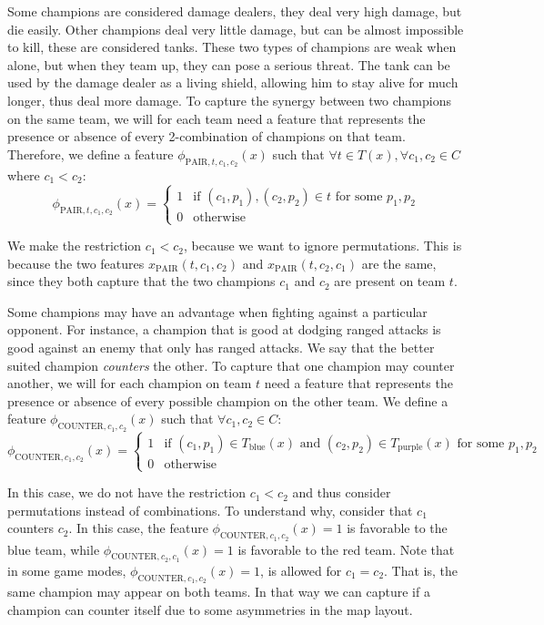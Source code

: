Some champions are considered damage dealers, they deal very high damage, but die easily. Other champions deal very little damage, but can be almost impossible to kill, these are considered tanks. These two types of champions are weak when alone, but when they team up, they can pose a serious threat. The tank can be used by the damage dealer as a living shield, allowing him to stay alive for much longer, thus deal more damage.
To capture the synergy between two champions on the same team, we will for each team need a feature that represents the presence or absence of every 2-combination of champions on that team. Therefore, we define a feature $\phi_{\text{PAIR},t, c_1, c_2}(x)$ such that $\forall t \in T(x), \forall c_1, c_2 \in C$ where $c_1 < c_2$:
\begin{equation}\label{eq:pair}
\phi_{\text{PAIR}, t, c_1, c_2}(x) =
\begin{cases}
  1 & \text{if } (c_1, p_1), (c_2, p_2) \in t \text{ for some }p_1, p_2\\
  0 & \text{otherwise}
\end{cases}
\end{equation}

We make the restriction $c_1 < c_2$, because we want to ignore permutations. This is because the two features $x_\text{PAIR}(t, c_1, c_2)$ and $x_\text{PAIR}(t, c_2, c_1)$ are the same, since they both capture that the two champions $c_1$ and $c_2$ are present on team $t$.

Some champions may have an advantage when fighting against a particular opponent.
For instance, a champion that is good at dodging ranged attacks is good against an enemy that only has ranged attacks.
We say that the better suited champion \emph{counters} the other.
To capture that one champion may counter another, we will for each champion on team $t$ need a feature that represents the presence or absence of every possible champion on the other team.
We define a feature $\phi_{\text{COUNTER},c_1,c_2}(x)$ such that $\forall c_1, c_2 \in C:$
\begin{equation}\label{eq:counter}
\phi_{\text{COUNTER},c_1,c_2}(x) = 
\begin{cases} 
1 & \text{if } (c_1, p_1) \in T_\text{blue}(x) \text{ and } (c_2, p_2) \in T_\text{purple}(x) \text{ for some } p_1, p_2 \\ 
0 & \text{otherwise} 
\end{cases}
\end{equation}

In this case, we do not have the restriction $c_1 < c_2$ and thus consider permutations instead of combinations.
To understand why, consider that $c_1$ counters $c_2$.
In this case, the feature $\phi_{\text{COUNTER},c_1,c_2}(x) = 1$ is favorable to the blue team, while $\phi_{\text{COUNTER},c_2,c_1}(x) = 1$ is favorable to the red team.
Note that in some game modes, $\phi_{\text{COUNTER},c_1,c_2}(x) = 1$, is allowed for $c_1 = c_2$. That is, the same champion may appear on both teams.
In that way we can capture if a champion can counter itself due to some asymmetries in the map layout.

